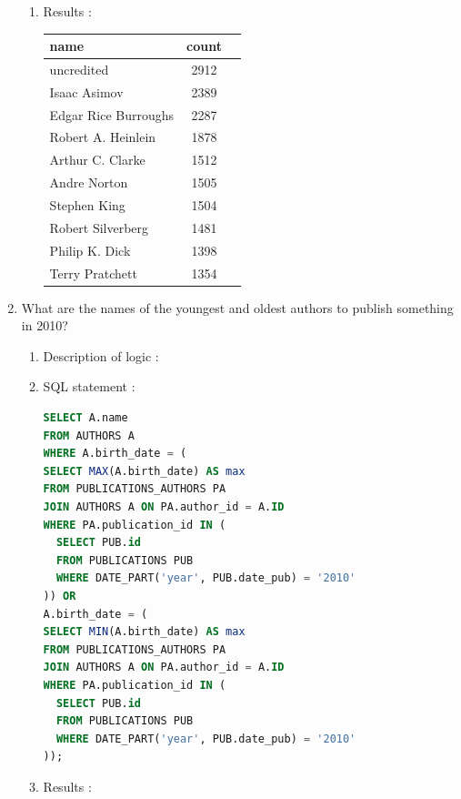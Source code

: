 \documentclass[doubleside, titlepage]{article}
\begin{document}
\begin{enumerate}
\begin{enumerate}
	\item Results :\\
	
	\begin{tabular}{|l|c|r|}
  \hline
  name & count \\
  \hline	
uncredited & 2912\\
Isaac Asimov & 2389\\
Edgar Rice Burroughs & 2287\\
Robert A. Heinlein	& 1878\\
Arthur C. Clarke & 1512\\
Andre Norton & 1505\\
Stephen King & 1504\\
Robert Silverberg & 1481\\
Philip K. Dick & 1398\\
Terry Pratchett	& 1354\\
  \hline
\end{tabular}

	\end{enumerate}
\newpage
\item What are the names of the youngest and oldest authors to publish something in 2010?
	
			\begin{enumerate}
	\item Description of logic :\\
	\item SQL statement :
		\begin{lstlisting}[language=SQL,showspaces=false,basicstyle=\ttfamily,numberstyle=\tiny,commentstyle=\color{gray}]
SELECT A.name
FROM AUTHORS A
WHERE A.birth_date = (
SELECT MAX(A.birth_date) AS max
FROM PUBLICATIONS_AUTHORS PA
JOIN AUTHORS A ON PA.author_id = A.ID
WHERE PA.publication_id IN (
  SELECT PUB.id
  FROM PUBLICATIONS PUB
  WHERE DATE_PART('year', PUB.date_pub) = '2010'
)) OR
A.birth_date = (
SELECT MIN(A.birth_date) AS max
FROM PUBLICATIONS_AUTHORS PA
JOIN AUTHORS A ON PA.author_id = A.ID
WHERE PA.publication_id IN (
  SELECT PUB.id
  FROM PUBLICATIONS PUB
  WHERE DATE_PART('year', PUB.date_pub) = '2010'
));
		\end{lstlisting}

	\item Results :\\
	

\end{enumerate}
\end{enumerate}
\end{document}
